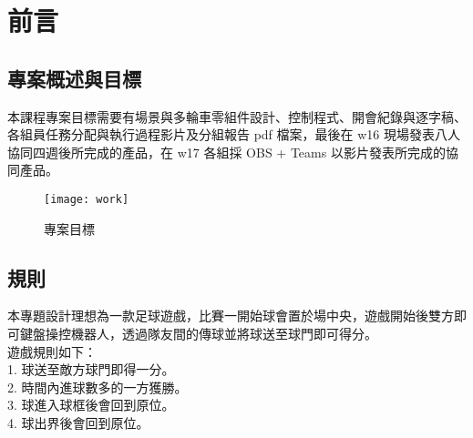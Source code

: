 \chapter{前言}
\renewcommand{\baselinestretch}{10.0} %
\setcounter{page}{1}  %
\fontsize{14pt}{2.5pt}\sectionef
\section{專案概述與目標}
本課程專案目標需要有場景與多輪車零組件設計、控制程式、開會紀錄與逐字稿、各組員任務分配與執行過程影片及分組報告 pdf 檔案，最後在 w16 現場發表八人協同四週後所完成的產品，在 w17 各組採 OBS + Teams 以影片發表所完成的協同產品。\\
\begin{figure}[hbt!]
\begin{center}
\texttt{[image: work]}
\caption{\Large 專案目標}\label{專案目標}
\end{center}
\end{figure} 

\section{規則}
本專題設計理想為一款足球遊戲，比賽一開始球會置於場中央，遊戲開始後雙方即
可鍵盤操控機器人，透過隊友間的傳球並將球送至球門即可得分。\\
遊戲規則如下：\\
1. 球送至敵方球門即得一分。\\
2. 時間內進球數多的一方獲勝。\\
3. 球進入球框後會回到原位。\\
4. 球出界後會回到原位。\\
\renewcommand{\baselinestretch}{0.5} %